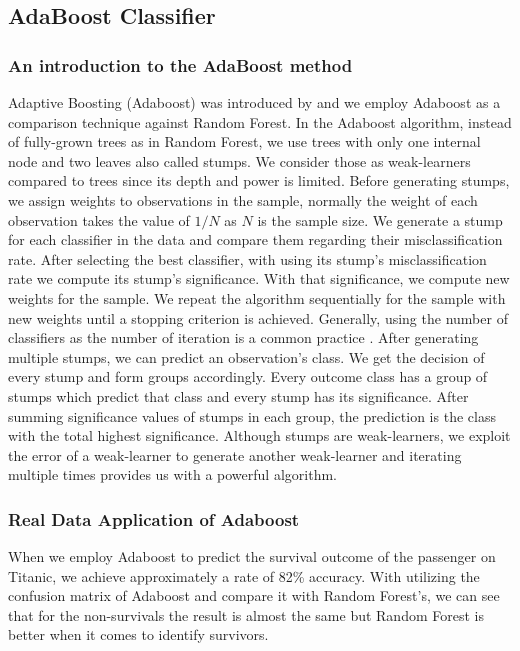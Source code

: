 \subsection{AdaBoost Classifier}
\label{sec:adaboost}

\subsubsection{An introduction to the AdaBoost method}
Adaptive Boosting (Adaboost) was introduced by \cite{freund1997boosting} and we employ Adaboost as a comparison 
technique against Random Forest. In the Adaboost algorithm, instead of fully-grown trees as in Random Forest, 
we use trees with only one internal node and two leaves also called stumps. We consider those as weak-learners 
compared to trees since its depth and power is limited. Before generating stumps, 
we assign weights to observations in the sample, normally the weight of each observation takes the value 
of $1/N$ as $N$ is the sample size. We generate a stump for each classifier in the data and compare them regarding 
their misclassification rate. After selecting the best classifier, with using its stump's misclassification rate 
we compute its stump's significance. With that significance, we compute new weights for the sample. 
We repeat the algorithm sequentially for the sample with new weights until a stopping criterion is achieved. 
Generally, using the number of classifiers as the number of iteration is a common practice \cite{friedman2001elements}. 
After generating multiple stumps, we can predict an observation's class. 
We get the decision of every stump and form groups accordingly. 
Every outcome class has a group of stumps which predict that class and every stump has its significance. 
After summing significance values of stumps in each group, the prediction is the class with the total highest significance. 
Although stumps are weak-learners, we exploit the error of a weak-learner to generate another weak-learner 
and iterating multiple times provides us with a powerful algorithm.

\subsubsection{Real Data Application of Adaboost}
When we employ Adaboost to predict the survival outcome of the passenger on Titanic, we achieve approximately a rate of 82\% accuracy. With utilizing the confusion matrix of Adaboost and compare it with Random Forest's, we can see that for the non-survivals the result is almost the same but Random Forest is better when it comes to identify survivors.

